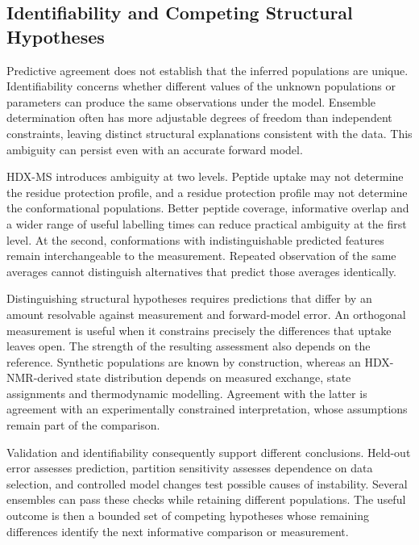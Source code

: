 \subsection{Identifiability and Competing Structural Hypotheses}
\label{sec:bg-identifiability}

Predictive agreement does not establish that the inferred populations are unique. Identifiability concerns whether different values of the unknown populations or parameters can produce the same observations under the model. Ensemble determination often has more adjustable degrees of freedom than independent constraints, leaving distinct structural explanations consistent with the data.\supercite{berlinRecoveringRepresentativeConformational2013,bonomiPrinciplesProteinStructural2017} This ambiguity can persist even with an accurate forward model.

HDX-MS introduces ambiguity at two levels. Peptide uptake may not determine the residue protection profile, and a residue protection profile may not determine the conformational populations. Better peptide coverage, informative overlap and a wider range of useful labelling times can reduce practical ambiguity at the first level.\supercite{skinnerEstimatingConstraintsProtection2019} At the second, conformations with indistinguishable predicted features remain interchangeable to the measurement. Repeated observation of the same averages cannot distinguish alternatives that predict those averages identically.

Distinguishing structural hypotheses requires predictions that differ by an amount resolvable against measurement and forward-model error. An orthogonal measurement is useful when it constrains precisely the differences that uptake leaves open. The strength of the resulting assessment also depends on the reference. Synthetic populations are known by construction, whereas an HDX-NMR-derived state distribution depends on measured exchange, state assignments and thermodynamic modelling.\supercite{moulickPartiallyUnfoldedForms2015} Agreement with the latter is agreement with an experimentally constrained interpretation, whose assumptions remain part of the comparison.

Validation and identifiability consequently support different conclusions. Held-out error assesses prediction, partition sensitivity assesses dependence on data selection, and controlled model changes test possible causes of instability. Several ensembles can pass these checks while retaining different populations. The useful outcome is then a bounded set of competing hypotheses whose remaining differences identify the next informative comparison or measurement.

